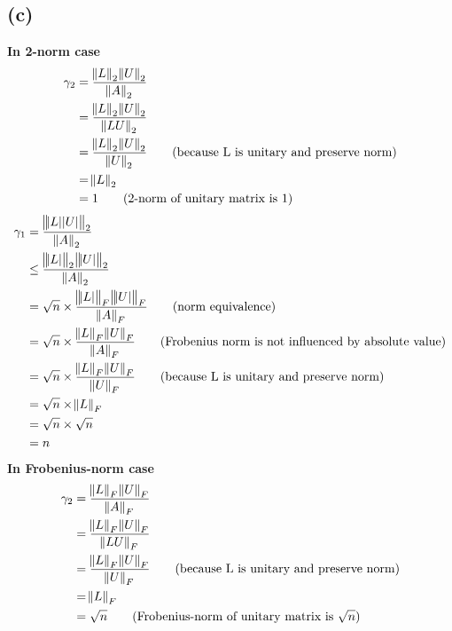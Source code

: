 \documentclass[12pt]{article}
\begin{document}
    \subsection*{(c)}
        \textbf{In 2-norm case}
        \begin{equation*}    
            \begin{aligned}
                \gamma_2 &= \frac{\norm{L}_2\norm{U}_2}{\norm{A}_2}\\
                         &= \frac{\norm{L}_2\norm{U}_2}{\norm{LU}_2}\\
                         &= \frac{\norm{L}_2\norm{U}_2}{\norm{U}_2} \qquad \text{(because L is unitary and preserve norm)}\\
                         &= \norm{L}_2\\
                         &= 1 \qquad \text{(2-norm of unitary matrix is 1)}\\
            \end{aligned}
        \end{equation*}
        \begin{equation*}    
            \begin{aligned}
                \gamma_1 &= \frac{\norm{\abs{L}\abs{U}}_2}{\norm{A}_2}\\
                         &\leq \frac{\norm{\abs{L}}_2\norm{\abs{U}}_2}{\norm{A}_2}\\
                         &= \sqrt{n} \times \frac{\norm{\abs{L}}_F\norm{\abs{U}}_F}{\norm{A}_F} \qquad \text{(norm equivalence)}\\
                         &= \sqrt{n} \times \frac{\norm{L}_F\norm{U}_F}{\norm{A}_F} \qquad \text{(Frobenius norm is not influenced by absolute value)}\\
                         &= \sqrt{n} \times \frac{\norm{L}_F\norm{U}_F}{\norm{U}_F} \qquad \text{(because L is unitary and preserve norm)}\\
                         &= \sqrt{n} \times \norm{L}_F\\
                         &= \sqrt{n} \times \sqrt{n}\\
                         &= n\\
            \end{aligned}
        \end{equation*}
        \textbf{In Frobenius-norm case}
        \begin{equation*}    
            \begin{aligned}
                \gamma_2 &= \frac{\norm{L}_F\norm{U}_F}{\norm{A}_F}\\
                         &= \frac{\norm{L}_F\norm{U}_F}{\norm{LU}_F}\\
                         &= \frac{\norm{L}_F\norm{U}_F}{\norm{U}_F} \qquad \text{(because L is unitary and preserve norm)}\\
                         &= \norm{L}_F\\
                         &= \sqrt{n} \qquad \text{(Frobenius-norm of unitary matrix is $\sqrt{n}$)}\\
            \end{aligned}
        \end{equation*}
\end{document}

